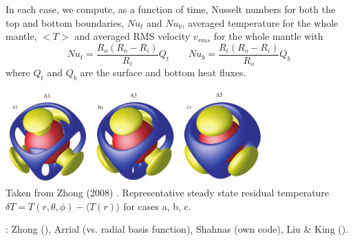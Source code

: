 

In each case, we compute, as a function of time, Nusselt 
numbers for both the top and bottom boundaries, $Nu_t$ and $Nu_b$, 
averaged temperature for
the whole mantle, $<T>$ and averaged RMS velocity $v_{rms}$ for the whole mantle
with
\[
Nu_t=\frac{R_o(R_o-R_i)}{R_i} Q_t
\quad\quad
Nu_b=\frac{R_i(R_o-R_i)}{R_o} Q_b
\]
where $Q_t$ and $Q_b$ are the surface and bottom heat fluxes.

\begin{center}
\includegraphics[width=10cm]{images/benchmark_sscb3D/zhmt08}\\
{\captionfont Taken from Zhong \etal (2008) \cite{zhmt08}. 
Representative steady state residual temperature 
$\delta T = T(r,\theta,\phi)-\langle T(r) \rangle$ for cases a, b, c.}
\end{center}


\Literature: Zhong \etal \cite{zhmt08} (\citcoms), Arrial \etal \cite{arfw14}
(\citcoms vs. radial basis function), Shahnas \etal \cite{shpe15} (own code), 
Liu \& King \cite{liki19} (\aspect).





